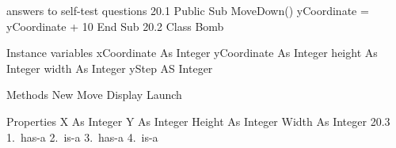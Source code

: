 answers to self-test questions
20.1	Public Sub MoveDown()
		yCoordinate = yCoordinate + 10
	End Sub
20.2	Class Bomb

	Instance variables
	xCoordinate As Integer
	yCoordinate As Integer
	height As Integer
	width As Integer		
	yStep AS Integer

	Methods
	New
	Move
	Display
	Launch

	Properties
	X As Integer	
	Y As Integer
	Height As Integer
	Width As Integer
20.3	1. has-a
	2. is-a
	3. has-a
	4. is-a


